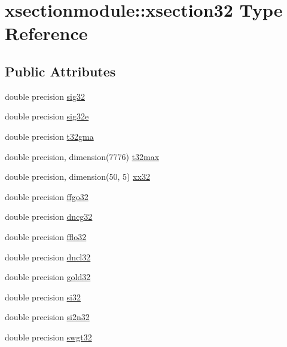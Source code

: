 \hypertarget{structxsectionmodule_1_1xsection32}{}\section{xsectionmodule\+:\+:xsection32 Type Reference}
\label{structxsectionmodule_1_1xsection32}
\subsection*{Public Attributes}
\begin{DoxyCompactItemize}
\item 
double precision \hyperlink{structxsectionmodule_1_1xsection32_a3b05406b6591eab1cf81428750525abd}{sig32}
\item 
double precision \hyperlink{structxsectionmodule_1_1xsection32_ac8f0eb0e5f21c70a14fd0e5b55c24a9a}{sig32e}
\item 
double precision \hyperlink{structxsectionmodule_1_1xsection32_ac07bc29c3842c8cf2f99c2fd6f1dff5b}{t32gma}
\item 
double precision, dimension(7776) \hyperlink{structxsectionmodule_1_1xsection32_a55491117206c0657bbb049893d57598b}{t32max}
\item 
double precision, dimension(50, 5) \hyperlink{structxsectionmodule_1_1xsection32_a515e3652fe0a77f34834dd0b7e50d7e8}{xx32}
\item 
double precision \hyperlink{structxsectionmodule_1_1xsection32_a313773e0204b870e523b72c8f59cdf5d}{ffgo32}
\item 
double precision \hyperlink{structxsectionmodule_1_1xsection32_a369967442c04621850c99495f58834d2}{dncg32}
\item 
double precision \hyperlink{structxsectionmodule_1_1xsection32_aaddbde350af44e50fef507333ab403a5}{fflo32}
\item 
double precision \hyperlink{structxsectionmodule_1_1xsection32_a6b634c02eb2926ac7711c67ed19c2547}{dncl32}
\item 
double precision \hyperlink{structxsectionmodule_1_1xsection32_a3615884c96433c09ba3ef16669f3e40e}{gold32}
\item 
double precision \hyperlink{structxsectionmodule_1_1xsection32_a54cedef83b7619aa6270ce15553fd41f}{si32}
\item 
double precision \hyperlink{structxsectionmodule_1_1xsection32_a6e19bafe1ce306f94640f17d44e0a3b2}{si2n32}
\item 
double precision \hyperlink{structxsectionmodule_1_1xsection32_a0ddcc7c851f59118bb4e5b27bf1c5a7e}{swgt32}

\end{DoxyCompactItemize}
